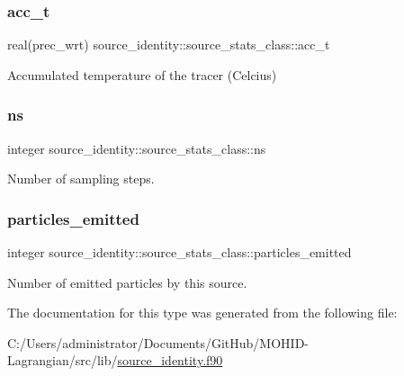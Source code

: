 \subsubsection{\texorpdfstring{acc\+\_\+t}{acc\_t}}
{\footnotesize\ttfamily real(prec\+\_\+wrt) source\+\_\+identity\+::source\+\_\+stats\+\_\+class\+::acc\+\_\+t\hspace{0.3cm}{\ttfamily [private]}}



Accumulated temperature of the tracer (Celcius) 

\mbox{\label{structsource__identity_1_1source__stats__class_a978883318dd2750f36ad1d6fe367dc46}} 
\subsubsection{\texorpdfstring{ns}{ns}}
{\footnotesize\ttfamily integer source\+\_\+identity\+::source\+\_\+stats\+\_\+class\+::ns\hspace{0.3cm}{\ttfamily [private]}}



Number of sampling steps. 

\mbox{\label{structsource__identity_1_1source__stats__class_a56ec334a178feedfc7ad55a1369fc89a}} 
\subsubsection{\texorpdfstring{particles\+\_\+emitted}{particles\_emitted}}
{\footnotesize\ttfamily integer source\+\_\+identity\+::source\+\_\+stats\+\_\+class\+::particles\+\_\+emitted\hspace{0.3cm}{\ttfamily [private]}}



Number of emitted particles by this source. 



The documentation for this type was generated from the following file\+:\begin{DoxyCompactItemize}
\item 
C\+:/\+Users/administrator/\+Documents/\+Git\+Hub/\+M\+O\+H\+I\+D-\/\+Lagrangian/src/lib/\mbox{\hyperlink{source__identity_8f90}{source\+\_\+identity.\+f90}}\end{DoxyCompactItemize}
